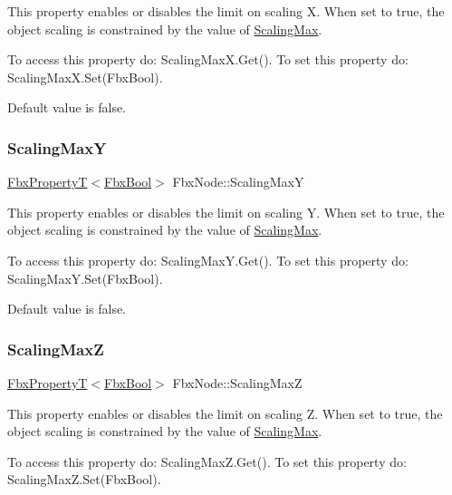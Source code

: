This property enables or disables the limit on scaling X. When set to {\ttfamily true}, the object scaling is constrained by the value of \hyperlink{class_fbx_node_a530a22a286aa932f665abfa1bbda2ea8}{Scaling\+Max}.

To access this property do\+: Scaling\+Max\+X.\+Get(). To set this property do\+: Scaling\+Max\+X.\+Set(\+Fbx\+Bool).

Default value is false. \mbox{\label{class_fbx_node_a6a515f87577f63a57a7fe8a6c971d9ad}} 
\subsubsection{\texorpdfstring{Scaling\+MaxY}{ScalingMaxY}}
{\footnotesize\ttfamily \hyperlink{class_fbx_property_t}{Fbx\+PropertyT}$<$\hyperlink{fbxtypes_8h_a92e0562b2fe33e76a242f498b362262e}{Fbx\+Bool}$>$ Fbx\+Node\+::\+Scaling\+MaxY}

This property enables or disables the limit on scaling Y. When set to {\ttfamily true}, the object scaling is constrained by the value of \hyperlink{class_fbx_node_a530a22a286aa932f665abfa1bbda2ea8}{Scaling\+Max}.

To access this property do\+: Scaling\+Max\+Y.\+Get(). To set this property do\+: Scaling\+Max\+Y.\+Set(\+Fbx\+Bool).

Default value is false. \mbox{\label{class_fbx_node_af4c72a83f64207cbcad432a5f48432af}} 
\subsubsection{\texorpdfstring{Scaling\+MaxZ}{ScalingMaxZ}}
{\footnotesize\ttfamily \hyperlink{class_fbx_property_t}{Fbx\+PropertyT}$<$\hyperlink{fbxtypes_8h_a92e0562b2fe33e76a242f498b362262e}{Fbx\+Bool}$>$ Fbx\+Node\+::\+Scaling\+MaxZ}

This property enables or disables the limit on scaling Z. When set to {\ttfamily true}, the object scaling is constrained by the value of \hyperlink{class_fbx_node_a530a22a286aa932f665abfa1bbda2ea8}{Scaling\+Max}.

To access this property do\+: Scaling\+Max\+Z.\+Get(). To set this property do\+: Scaling\+Max\+Z.\+Set(\+Fbx\+Bool).

